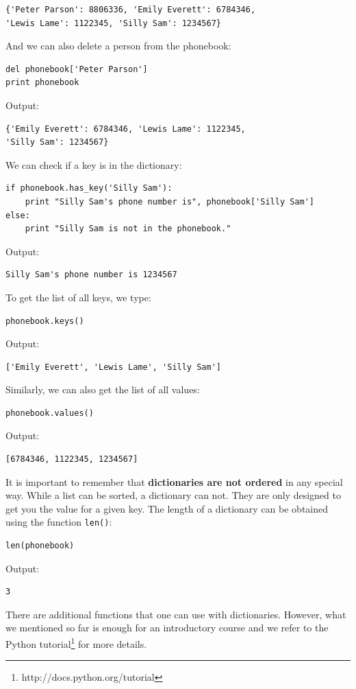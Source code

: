 \begin{verbatim}
{'Peter Parson': 8806336, 'Emily Everett': 6784346,
'Lewis Lame': 1122345, 'Silly Sam': 1234567}
\end{verbatim}
And we can also delete a person from the phonebook:

\begin{verbatim}
del phonebook['Peter Parson']
print phonebook
\end{verbatim}
Output:

\begin{verbatim}
{'Emily Everett': 6784346, 'Lewis Lame': 1122345, 
'Silly Sam': 1234567}
\end{verbatim}
We can check if a key is in the dictionary:

\begin{verbatim}
if phonebook.has_key('Silly Sam'):
    print "Silly Sam's phone number is", phonebook['Silly Sam']
else:
    print "Silly Sam is not in the phonebook."
\end{verbatim}
Output:

\begin{verbatim}
Silly Sam's phone number is 1234567
\end{verbatim}
To get the list of all keys, we type:

\begin{verbatim}
phonebook.keys()
\end{verbatim}
Output:

\begin{verbatim}
['Emily Everett', 'Lewis Lame', 'Silly Sam']
\end{verbatim}
Similarly, we can also get the list of all values:

\begin{verbatim}
phonebook.values()
\end{verbatim}
Output:

\begin{verbatim}
[6784346, 1122345, 1234567]
\end{verbatim}
It is important to remember that {\bf dictionaries are not ordered} in any 
special way. While a list can be sorted, a dictionary can not. They are only 
designed to get you the value for a given key. 
The length of a dictionary can be obtained using the function {\tt len()}:

\begin{verbatim}
len(phonebook)
\end{verbatim}
Output:

\begin{verbatim}
3
\end{verbatim}
There are additional functions that one can use with dictionaries. However, 
what we mentioned so far is enough for an introductory course and we refer 
to the Python tutorial\footnote{http://docs.python.org/tutorial} for more 
details.


